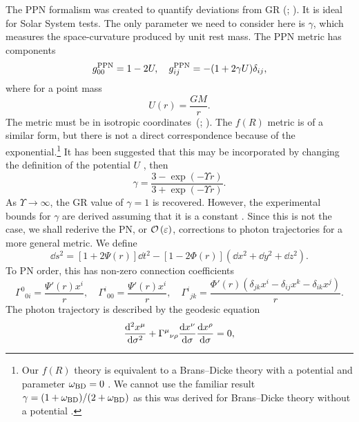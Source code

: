 The PPN formalism was created to quantify deviations from GR (\citealt[chapter 4]{Will1993}; \citealt{Will2006}). It is ideal for Solar System tests. The only parameter we need to consider here is $\gamma$, which measures the space-curvature produced by unit rest mass. The PPN metric has components
\begin{equation}
g^\mathrm{PPN}_{00} = 1 - 2U, \quad g^\mathrm{PPN}_{ij} = -(1 + 2\gamma U)\delta_{ij},
\end{equation}
where for a point mass
\begin{equation}
U(r) = \dfrac{GM}{r}.
\end{equation}
The metric must be in isotropic coordinates~(\citealt[section 40.1]{Misner1973}; \citealt[section 4.1(c)]{Will1993}). The $f(R)$ metric  is of a similar form, but there is not a direct correspondence because of the exponential.\footnote{Our $f(R)$ theory is equivalent to a Brans--Dicke theory with a potential and parameter $\omega_\mathrm{BD} = 0$ \citep{Teyssandier1983, Wands1994}. We cannot use the familiar result $\gamma = (1 + \omega_\mathrm{BD})/(2 + \omega_\mathrm{BD})$ \citep{Will2006} as this was derived for Brans--Dicke theory without a potential \citep[section 5.3]{Will1993}.} It has been suggested that this may be incorporated by changing the definition of the potential $U$ \citep{Olmo2007c, Faulkner2007, Bisabr2010, DeFelice2010}, then
\begin{equation}
\gamma = \dfrac{3 - \exp(-\Upsilon r)}{3 + \exp(-\Upsilon r)}.
\end{equation}
As $\Upsilon \rightarrow \infty$, the GR value of $\gamma = 1$ is recovered. However, the experimental bounds for $\gamma$ are derived assuming that it is a constant \citep[section 6.1]{Will1993}. Since this is not the case, we shall rederive the PN, or $\mathcal{O}\left({\varepsilon}\right)$, corrections to photon trajectories for a more general metric. We define
\begin{equation}
\dd s^2 = \left[1+2\Psi(r)\right]\dd t^2 - \left[1 - 2\Phi(r)\right]\left(\dd x^2 + \dd y^2 + \dd z^2\right).
\end{equation}
To PN order, this has non-zero connection coefficients
\begin{equation}
{\Gamma^0}_{0i} = \dfrac{\Psi'(r) x^i}{r}, \quad {\Gamma^i}_{00} = \dfrac{\Psi'(r) x^i}{r}, \quad
{\Gamma^i}_{jk} = \dfrac{\Phi'(r)\left(\delta_{jk}x^i - \delta_{ij}x^k - \delta_{ik}x^j\right)}{r}.
\end{equation}
The photon trajectory is described by the geodesic equation
\begin{equation}
\dfrac{\mathrm{d}^2 {x^\mu}}{\mathrm{d} {\sigma}^2} + {\Gamma^\mu}_{\nu\rho}\dfrac{\mathrm{d} {x^\nu}}{\mathrm{d} {\sigma}}\dfrac{\mathrm{d} {x^\rho}}{\mathrm{d} {\sigma}} = 0,
\label{eq:Geodesic}
\end{equation}
